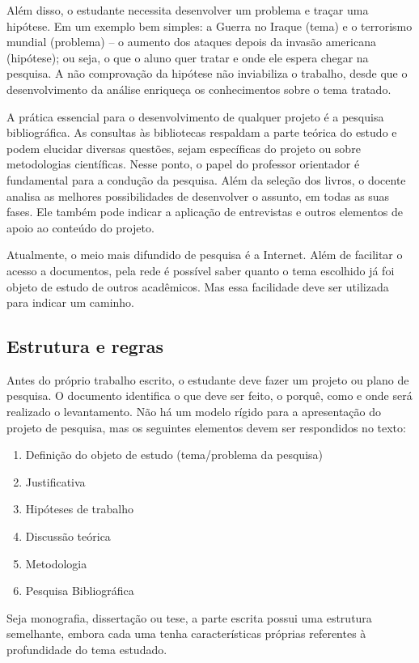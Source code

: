 Além disso, o estudante necessita desenvolver um problema e traçar uma hipótese. Em um exemplo bem simples: a Guerra no Iraque (tema) e o terrorismo mundial (problema) – o aumento dos ataques depois da invasão americana (hipótese); ou seja, o que o aluno quer tratar e onde ele espera chegar na pesquisa. A não comprovação da hipótese não inviabiliza o trabalho, desde que o desenvolvimento da análise enriqueça os conhecimentos sobre o tema tratado.

A prática essencial para o desenvolvimento de qualquer projeto é a pesquisa bibliográfica. As consultas às bibliotecas respaldam a parte teórica do estudo e podem elucidar diversas questões, sejam específicas do projeto ou sobre metodologias científicas. Nesse ponto, o papel do professor orientador é fundamental para a condução da pesquisa. Além da seleção dos livros, o docente analisa as melhores possibilidades de desenvolver o assunto, em todas as suas fases. Ele também pode indicar a aplicação de entrevistas e outros elementos de apoio ao conteúdo do projeto.

Atualmente, o meio mais difundido de pesquisa é a Internet. Além de facilitar o acesso a documentos, pela rede é possível saber quanto o tema escolhido já foi objeto de estudo de outros acadêmicos. Mas essa facilidade deve ser utilizada para indicar um caminho.

\subsection{Estrutura e regras}
Antes do próprio trabalho escrito, o estudante deve fazer um projeto ou plano de pesquisa. O documento identifica o que deve ser feito, o porquê, como e onde será realizado o levantamento. Não há um modelo rígido para a apresentação do projeto de pesquisa, mas os seguintes elementos devem ser respondidos no texto:

\begin{enumerate}
  \item Definição do objeto de estudo (tema/problema da pesquisa)
  \item Justificativa
  \item Hipóteses de trabalho
  \item Discussão teórica
  \item Metodologia
  \item Pesquisa Bibliográfica
\end{enumerate}

Seja monografia, dissertação ou tese, a parte escrita possui uma estrutura semelhante, embora cada uma tenha características próprias referentes à profundidade do tema estudado.

